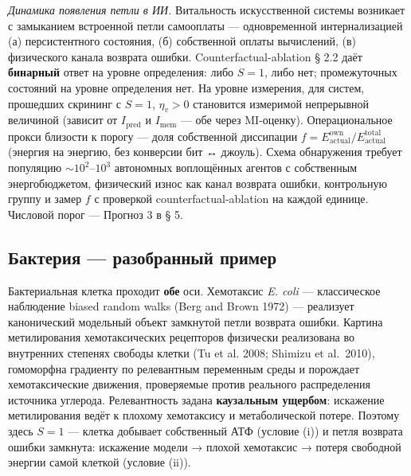 \documentclass[pdflatex,sn-mathphys-ay]{sn-jnl}
\begin{document}
\emph{Динамика появления петли в ИИ.} Витальность искусственной системы возникает с замыканием встроенной петли самооплаты --- одновременной интернализацией (а) персистентного состояния, (б) собственной оплаты вычислений, (в) физического канала возврата ошибки. Counterfactual-ablation § 2.2 даёт \textbf{бинарный} ответ на уровне определения: либо \(S = 1\), либо нет; промежуточных состояний на уровне определения нет. На уровне измерения, для систем, прошедших скрининг с \(S = 1\), \(\eta_v > 0\) становится измеримой непрерывной величиной (зависит от \(I_{\text{pred}}\) и \(I_{\text{mem}}\) --- обе через MI-оценку). Операциональное прокси близости к порогу --- доля собственной диссипации \(f = E_{\text{actual}}^{\text{own}}/E_{\text{actual}}^{\text{total}}\) (энергия на энергию, без конверсии бит ↔ джоуль). Схема обнаружения требует популяцию \(\sim 10^2\)--\(10^3\) автономных воплощённых агентов с собственным энергобюджетом, физический износ как канал возврата ошибки, контрольную группу и замер \(f\) с проверкой counterfactual-ablation на каждой единице. Числовой порог --- Прогноз 3 в § 5.

\subsection{Бактерия --- разобранный пример}\label{ux431ux430ux43aux442ux435ux440ux438ux44f-ux440ux430ux437ux43eux431ux440ux430ux43dux43dux44bux439-ux43fux440ux438ux43cux435ux440}

Бактериальная клетка проходит \textbf{обе} оси. Хемотаксис \emph{E. coli} --- классическое наблюдение biased random walks (Berg and Brown 1972) --- реализует канонический модельный объект замкнутой петли возврата ошибки. Картина метилирования хемотаксических рецепторов физически реализована во внутренних степенях свободы клетки (Tu et al. 2008; Shimizu et al.~2010), гомоморфна градиенту по релевантным переменным среды и порождает хемотаксические движения, проверяемые против реального распределения источника углерода. Релевантность задана \textbf{каузальным ущербом}: искажение метилирования ведёт к плохому хемотаксису и метаболической потере. Поэтому здесь \(S = 1\) --- клетка добывает собственный АТФ (условие (i)) и петля возврата ошибки замкнута: искажение модели → плохой хемотаксис → потеря свободной энергии самой клеткой (условие (ii)).
\end{document}
